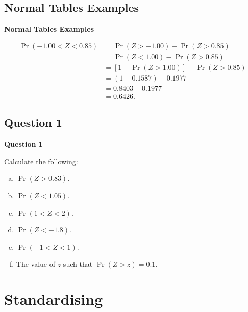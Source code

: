 \documentclass[compress]{beamer}        %
\makeatletter
\newcommand{\tcb}{\textcolor{beamer@blendedblue}}
\makeatother
\begin{document}
\subsection{Normal Tables Examples}
\begin{frame}{\bf \tcb{Normal Tables Examples}}

\begin{align*}
\Pr(-1.00 < Z < 0.85) &= \Pr(Z > -1.00) - \Pr(Z > 0.85) \\[0.3cm]
&= \Pr(Z < 1.00) - \Pr(Z > 0.85) \\[0.3cm]
&= \left[1 - \Pr(Z > 1.00)\right] - \Pr(Z > 0.85) \\[0.3cm]
&= (1 - 0.1587) - 0.1977 \\[0.3cm]
&= 0.8403 - 0.1977 \\[0.3cm]
&= 0.6426.
\end{align*}

\end{frame}



\subsection{Question 1}
\begin{frame}{\bf \tcb{Question 1}}

Calculate the following:\\[0.3cm]
\begin{enumerate}[a)]\itemsep0.3cm
\item $\Pr(Z > 0.83)$.
\item $\Pr(Z < 1.05)$.
\item $\Pr(1 < Z < 2)$.
\item $\Pr(Z < -1.8)$.
\item $\Pr(-1 < Z < 1)$.
\item The value of $z$ such that $\Pr(Z > z) = 0.1$.
\end{enumerate}

\end{frame}




\section{Standardising}
\end{document}

